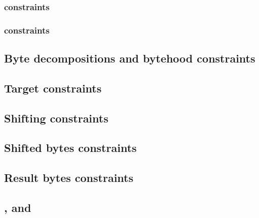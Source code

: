 \subsubsection{\someBits{} constraints}                                                   
\subsubsection{\known{} constraints}                                              
\subsection{Byte decompositions and bytehood constraints} \label{shf: byte dec}            
\subsection{Target constraints}                           \label{shf: target}     
\subsection{Shifting constraints}                                                 
\subsection{Shifted bytes constraints}                                            
\subsection{Result bytes constraints}                                             
\subsection{,  and }                                    
